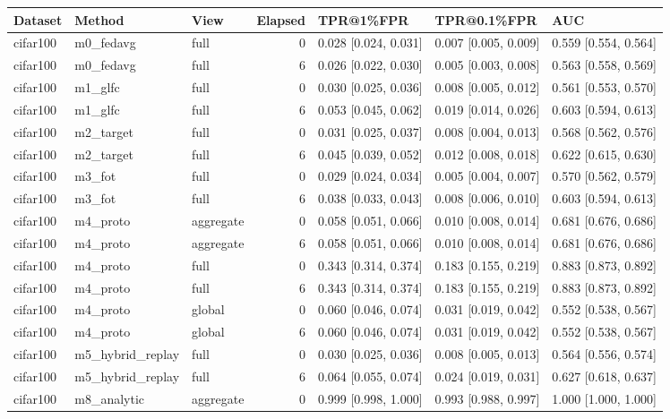 \begin{tabular}{lllrlll}
\toprule
Dataset & Method & View & Elapsed & TPR@1\%FPR & TPR@0.1\%FPR & AUC \\
\midrule
cifar100 & m0\_fedavg & full & 0 & 0.028 [0.024, 0.031] & 0.007 [0.005, 0.009] & 0.559 [0.554, 0.564] \\
cifar100 & m0\_fedavg & full & 6 & 0.026 [0.022, 0.030] & 0.005 [0.003, 0.008] & 0.563 [0.558, 0.569] \\
cifar100 & m1\_glfc & full & 0 & 0.030 [0.025, 0.036] & 0.008 [0.005, 0.012] & 0.561 [0.553, 0.570] \\
cifar100 & m1\_glfc & full & 6 & 0.053 [0.045, 0.062] & 0.019 [0.014, 0.026] & 0.603 [0.594, 0.613] \\
cifar100 & m2\_target & full & 0 & 0.031 [0.025, 0.037] & 0.008 [0.004, 0.013] & 0.568 [0.562, 0.576] \\
cifar100 & m2\_target & full & 6 & 0.045 [0.039, 0.052] & 0.012 [0.008, 0.018] & 0.622 [0.615, 0.630] \\
cifar100 & m3\_fot & full & 0 & 0.029 [0.024, 0.034] & 0.005 [0.004, 0.007] & 0.570 [0.562, 0.579] \\
cifar100 & m3\_fot & full & 6 & 0.038 [0.033, 0.043] & 0.008 [0.006, 0.010] & 0.603 [0.594, 0.613] \\
cifar100 & m4\_proto & aggregate & 0 & 0.058 [0.051, 0.066] & 0.010 [0.008, 0.014] & 0.681 [0.676, 0.686] \\
cifar100 & m4\_proto & aggregate & 6 & 0.058 [0.051, 0.066] & 0.010 [0.008, 0.014] & 0.681 [0.676, 0.686] \\
cifar100 & m4\_proto & full & 0 & 0.343 [0.314, 0.374] & 0.183 [0.155, 0.219] & 0.883 [0.873, 0.892] \\
cifar100 & m4\_proto & full & 6 & 0.343 [0.314, 0.374] & 0.183 [0.155, 0.219] & 0.883 [0.873, 0.892] \\
cifar100 & m4\_proto & global & 0 & 0.060 [0.046, 0.074] & 0.031 [0.019, 0.042] & 0.552 [0.538, 0.567] \\
cifar100 & m4\_proto & global & 6 & 0.060 [0.046, 0.074] & 0.031 [0.019, 0.042] & 0.552 [0.538, 0.567] \\
cifar100 & m5\_hybrid\_replay & full & 0 & 0.030 [0.025, 0.036] & 0.008 [0.005, 0.013] & 0.564 [0.556, 0.574] \\
cifar100 & m5\_hybrid\_replay & full & 6 & 0.064 [0.055, 0.074] & 0.024 [0.019, 0.031] & 0.627 [0.618, 0.637] \\
cifar100 & m8\_analytic & aggregate & 0 & 0.999 [0.998, 1.000] & 0.993 [0.988, 0.997] & 1.000 [1.000, 1.000] \\

\end{tabular}

